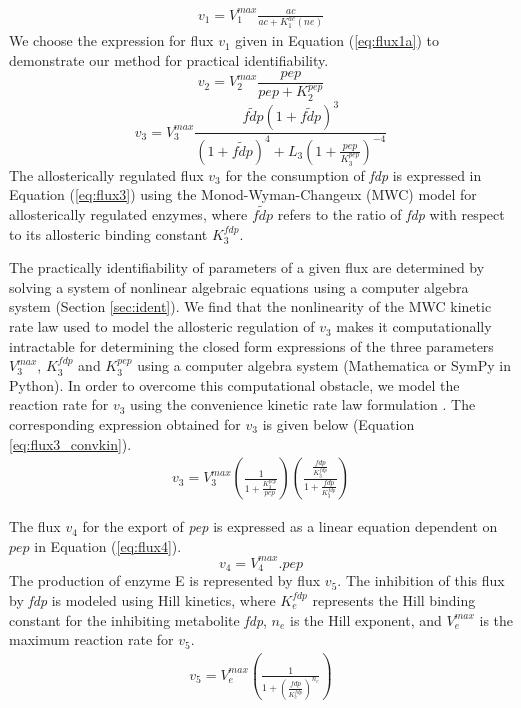 \documentclass[10pt]{article}
\begin{document}
	\begin{align}\label{eq:flux1a}
	v_1 = V_1^{max}\frac{ac}{ac+K_{1}^{ac}(ne)}
	\end{align}		
	We choose the expression for flux $v_1$ given in Equation (\ref{eq:flux1a}) to demonstrate our method for practical identifiability. 	
	\begin{equation}\label{eq:flux2}
	v_2 = V_{2}^{max}\frac{pep}{pep+K_{2}^{pep}}
	\end{equation}
	\begin{equation}\label{eq:flux3}
	v_3 = V_{3}^{max}\frac{\tilde{fdp}\left(1+\tilde{fdp}\right)^3}{\left(1+\tilde{fdp}\right)^4+L_3\left(1+\frac{pep}{K_{3}^{pep}}\right)^{-4}}
	\end{equation}
	The allosterically regulated flux $v_3$ for the consumption of \textit{fdp} is expressed in Equation (\ref{eq:flux3}) using the Monod-Wyman-Changeux (MWC) model for allosterically regulated enzymes, where $\tilde{fdp}$ refers to the ratio of \textit{fdp} with respect to its allosteric binding constant $K_{3}^{fdp}$. 
	
	The practically identifiability of parameters of a given flux are determined by solving a system of nonlinear algebraic equations using a computer algebra system (Section \ref{sec:ident}). We find that the nonlinearity of the MWC kinetic rate law used to model the allosteric regulation of $v_3$ makes it computationally intractable for determining the closed form expressions of the three parameters $V_3^{max}$, $K_3^{fdp}$ and $K_3^{pep}$ using a computer algebra system (Mathematica or SymPy in Python). In order to overcome this computational obstacle, we model the reaction rate for $v_3$ using the convenience kinetic rate law formulation \parencite{Liebermeister2006}. The corresponding expression obtained for $v_3$ is given below (Equation \ref{eq:flux3_convkin}). 	
	\begin{align}\label{eq:flux3_convkin}
	v_3 = V_3^{max}\left(\frac{1}{1 + \frac{K_3^{pep}}{pep}}\right)\left(\frac{\frac{fdp}{K_3^{fdp}}}{1 + \frac{fdp}{K_3^{fdp}}}\right)
	\end{align}	
	
	The flux $v_4$ for the export of \textit{pep} is expressed as a linear equation dependent on $pep$ in Equation (\ref{eq:flux4}).
	\begin{equation}\label{eq:flux4}
	v_4 = V_{4}^{max}.pep
	\end{equation}		
	The production of enzyme E is represented by flux $v_5$. The inhibition of this flux by \textit{fdp} is modeled using Hill kinetics, where $K_e^{fdp}$ represents the Hill binding constant for the inhibiting metabolite \textit{fdp}, $n_e$ is the Hill exponent, and $V_e^{max}$ is the maximum reaction rate for $v_5$.
	\begin{align}\label{eq:flux5}
	v_5 = V_e^{max}\left(\frac{1}{1+\left(\frac{fdp}{K_{e}^{fdp}}\right)^{n_e}}\right)
	\end{align}
		
\end{document}

